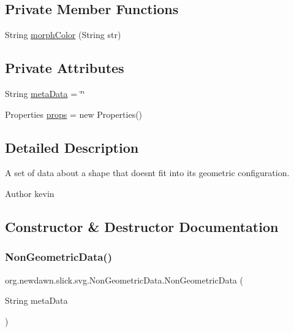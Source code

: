 \subsection*{Private Member Functions}
\begin{DoxyCompactItemize}
\item 
String \mbox{\hyperlink{classorg_1_1newdawn_1_1slick_1_1svg_1_1_non_geometric_data_a5f09ddab2253b5bb0c3bca43b6407d41}{morph\+Color}} (String str)
\end{DoxyCompactItemize}
\subsection*{Private Attributes}
\begin{DoxyCompactItemize}
\item 
String \mbox{\hyperlink{classorg_1_1newdawn_1_1slick_1_1svg_1_1_non_geometric_data_ab9720408fbd609767acb6528999a3f8d}{meta\+Data}} = \char`\"{}\char`\"{}
\item 
Properties \mbox{\hyperlink{classorg_1_1newdawn_1_1slick_1_1svg_1_1_non_geometric_data_a75a905ff1c7bf271e32602cdc7f06191}{props}} = new Properties()
\end{DoxyCompactItemize}


\subsection{Detailed Description}
A set of data about a shape that doesn\textquotesingle{}t fit into it\textquotesingle{}s geometric configuration.

\begin{DoxyAuthor}{Author}
kevin 
\end{DoxyAuthor}


\subsection{Constructor \& Destructor Documentation}
\mbox{\label{classorg_1_1newdawn_1_1slick_1_1svg_1_1_non_geometric_data_a4349e32bb3c859d2a19dca9a941f75af}} 
\subsubsection{\texorpdfstring{Non\+Geometric\+Data()}{NonGeometricData()}}
{\footnotesize\ttfamily org.\+newdawn.\+slick.\+svg.\+Non\+Geometric\+Data.\+Non\+Geometric\+Data (\begin{DoxyParamCaption}\item[{String}]{meta\+Data }\end{DoxyParamCaption})\hspace{0.3cm}{\ttfamily [inline]}}

